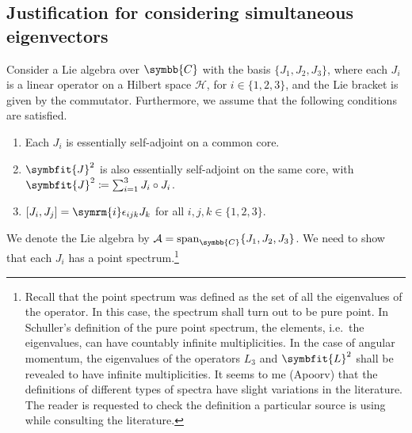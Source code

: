 \documentclass[12pt, a4 paper]{article}
\let\symcal\mathcal
\theoremstyle{definition}
\newcommand{\cc}{\symbb{C}}
\newcommand{\hilbert}{\symcal{H}}
\renewcommand{\i}{\symrm{i}}
\DeclareMathOperator{\spann}{span}
\begin{document}
    \subsection{Justification for considering simultaneous eigenvectors}

    Consider a Lie algebra over \(\cc\) with the basis \(\{J_1, J_2, J_3\}\), where each \(J_i\) is a linear operator on a Hilbert space \(\hilbert\), for \(i \in \{1, 2, 3\}\), and the Lie bracket is given by the commutator. Furthermore, we assume that the following conditions are satisfied.
    \begin{enumerate}
        \item Each \(J_i\) is essentially self-adjoint on a common core.
        \item \(\symbfit{J}^2\) is also essentially self-adjoint on the same core, with \(\symbfit{J}^2 \coloneq \sum_{i=1}^3 J_i \circ J_i\).
        \item \([J_i, J_j] = \i \epsilon_{ijk} J_k\) for all \(i, j, k \in \{1, 2, 3\}\).
    \end{enumerate}
    We denote the Lie algebra by \(\symcal{A} = \spann_{\cc}\{J_1, J_2, J_3\}\). We need to show that each \(J_i\) has a point spectrum.\footnote{Recall that the point spectrum was defined as the set of all the eigenvalues of the operator. In this case, the spectrum shall turn out to be pure point. In Schuller's definition of the pure point spectrum, the elements, i.e.\ the eigenvalues, can have countably infinite multiplicities. In the case of angular momentum, the eigenvalues of the operators \(L_3\) and \(\symbfit{L}^2\) shall be revealed to have infinite multiplicities. It seems to me (Apoorv) that the definitions of different types of spectra have slight variations in the literature. The reader is requested to check the definition a particular source is using while consulting the literature.}
\end{document}
